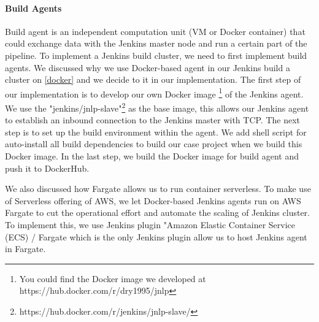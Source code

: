 \paragraph[]{Build Agents}
Build agent is an independent computation unit (VM or Docker container) that could exchange data with the Jenkins master node and run a certain part of the pipeline. To implement a Jenkins build cluster, we need to first implement build agents.
We discussed why we use Docker-based agent in our Jenkins build a cluster on \ref{docker} and we decide to it in our implementation. The first step of our implementation is to develop our own Docker image \footnote{You could find the Docker image we developed at https://hub.docker.com/r/dry1995/jnlp} of the Jenkins agent. We use the "jenkins/jnlp-slave"\footnote{https://hub.docker.com/r/jenkins/jnlp-slave/} as the base image, this allows our Jenkins agent to establish an inbound connection to the Jenkins master with TCP. The next step is to set up the build environment within the agent. We add shell script for auto-install all build dependencies to build our case project when we build this Docker image. In the last step, we build the Docker image for build agent and push it to DockerHub. 
\par
We also discussed how Fargate allows us to run container serverless. To make use of Serverless offering of AWS, we let Docker-based Jenkins agents run on AWS Fargate to cut the operational effort and automate the scaling of Jenkins cluster. To implement this, we use Jenkins plugin "Amazon Elastic Container Service (ECS) / Fargate which is the only Jenkins plugin allow us to host Jenkins agent in Fargate.  

